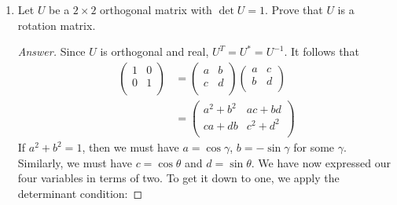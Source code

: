 \documentclass[../psets.tex]{subfiles}
\begin{document}
\begin{enumerate}[label={\textbf{6.\arabic*.}}]
\begin{enumerate}
\begin{align*}
\begin{pmatrix}
                1 & 1 & 0\\
                0 & 2 & 2\\
                0 & 0 & 3\\
            \end{pmatrix}&&
            \begin{pmatrix}
                1 & 0 & 0\\
                0 & 2 & 0\\
                0 & 0 & 3\\
            \end{pmatrix}
        \end{align*}
        \begin{proof}[Answer]
            Not unitarily equivalent.
            The sums from Problem 6.6b are not equal.
        \end{proof}
    \end{enumerate}
    \item Let $U$ be a $2\times 2$ orthogonal matrix with $\det U=1$. Prove that $U$ is a rotation matrix.
    \begin{proof}[Answer]
        Since $U$ is orthogonal and real, $U^T=U^*=U^{-1}$. It follows that
        \begin{align*}
            \begin{pmatrix}
                1 & 0\\
                0 & 1\\
            \end{pmatrix}
            &=
            \begin{pmatrix}
                a & b\\
                c & d\\
            \end{pmatrix}
            \begin{pmatrix}
                a & c\\
                b & d\\
            \end{pmatrix}\\
            &=
            \begin{pmatrix}
                a^2+b^2 & ac+bd\\
                ca+db & c^2+d^2\\
            \end{pmatrix}
        \end{align*}
        If $a^2+b^2=1$, then we must have $a=\cos\gamma$, $b=-\sin\gamma$ for some $\gamma$. Similarly, we must have $c=\cos\theta$ and $d=\sin\theta$. We have now expressed our four variables in terms of two. To get it down to one, we apply the determinant condition:

\end{proof}
\end{enumerate}
\end{document}
